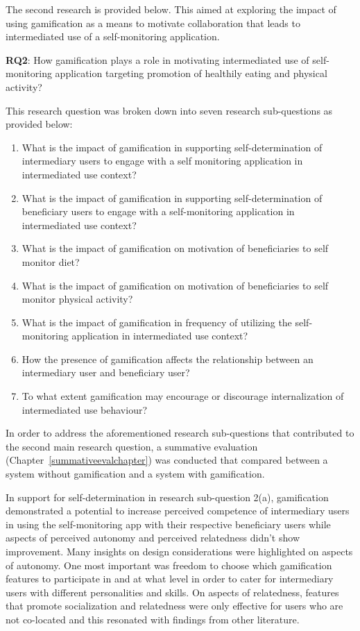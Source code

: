 The second research is provided below. This aimed at exploring the impact of using gamification as a means to motivate collaboration that leads to intermediated use of a self-monitoring application.

\textbf{RQ2}: How gamification plays a role in motivating intermediated use of self-monitoring application targeting promotion of healthily eating and physical activity?

This research question was broken down into seven research sub-questions as provided below:

\begin{enumerate}[label=\alph*.]
\item What is the impact of gamification in supporting self-determination of intermediary users to engage with a self monitoring application in intermediated use context?
\item What is the impact of gamification in supporting self-determination of beneficiary users to engage with a self-monitoring application in intermediated use context?
\item What is the impact of gamification on motivation of beneficiaries to self monitor diet?
\item What is the impact of gamification on motivation of beneficiaries to self monitor physical activity?
\item What is the impact of gamification in frequency of utilizing the self-monitoring application in intermediated use context?
\item How the presence of gamification affects the relationship between an intermediary user and beneficiary user?
\item To what extent gamification may encourage or discourage internalization of intermediated use behaviour?

\end{enumerate} 

In order to address the aforementioned research sub-questions that contributed to the second main research question, a summative evaluation (Chapter~\ref{summativeevalchapter}) was conducted that compared between a system without gamification and a system with gamification. 

In support for self-determination in research sub-question 2(a), gamification demonstrated a potential to increase perceived competence of intermediary users in using the self-monitoring app with their respective beneficiary users while aspects of perceived autonomy and perceived relatedness didn't show improvement. Many insights on design considerations were highlighted on aspects of autonomy. One most important was freedom to choose which gamification features to participate in and at what level in order to cater for intermediary users with different personalities and skills. On aspects of relatedness, features that promote socialization and relatedness were only effective for users who are not co-located and this resonated with findings from other literature. 

